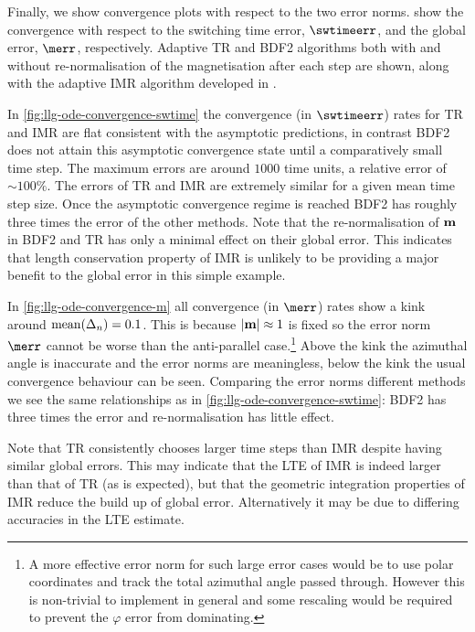 Finally, we show convergence plots with respect to the two error norms.
 show the convergence with respect to the switching time error, $\swtimeerr$, and the global error, $\merr$, respectively.
Adaptive TR and BDF2 algorithms both with and without re-normalisation of the magnetisation after
each step are shown, along with the adaptive IMR algorithm developed in .


In \cref{fig:llg-ode-convergence-swtime} the convergence (in $\swtimeerr$) rates for TR and IMR are flat consistent with the asymptotic predictions, in contrast BDF2 does not attain this asymptotic convergence state until a comparatively small time step.
The maximum errors are around $1000$ time units, a relative error of $\sim 100\%$.
The errors of TR and IMR are extremely similar for a given mean time step size.
Once the asymptotic convergence regime is reached BDF2 has roughly three times the error of the other methods.
Note that the re-normalisation of $\boldsymbol{\mathrm{m}}$ in BDF2 and TR has only a minimal effect on their global error.
This indicates that length conservation property of IMR is unlikely to be providing a major benefit to the global error in this simple example.


In \cref{fig:llg-ode-convergence-m} all convergence (in $\merr$) rates show a kink around $\operatorname{mean}(\Delta_{n}) = 0.1$.
This is because $\left|{\boldsymbol{\mathrm{m}}} \right| \approx 1$ is fixed so the error norm $\merr$ cannot be worse than the anti-parallel case.\footnote{A more effective error norm for such large error cases would be to use polar coordinates and track the total azimuthal angle passed through. However this is non-trivial to implement in general and some rescaling would be required to prevent the $\varphi$ error from dominating.}
Above the kink the azimuthal angle is inaccurate and the error norms are meaningless, below the kink the usual convergence behaviour can be seen.
Comparing the error norms different methods we see the same relationships as in \cref{fig:llg-ode-convergence-swtime}: BDF2 has three times the error and re-normalisation has little effect.


Note that TR consistently chooses larger time steps than IMR despite having similar global errors.
This may indicate that the LTE of IMR is indeed larger than that of TR (as is expected), but that the geometric integration properties of IMR reduce the build up of global error.
Alternatively it may be due to differing accuracies in the LTE estimate.


